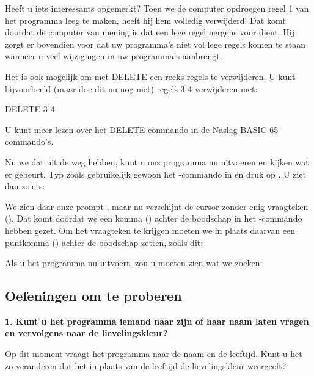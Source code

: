 
Heeft u iets interessants opgemerkt? Toen we de computer opdroegen regel 1 van het programma leeg te maken, heeft hij hem volledig verwijderd! Dat komt doordat de computer van mening is dat een lege regel nergens voor dient. Hij zorgt er bovendien voor dat uw programma's niet vol lege regels komen te staan wanneer u veel wijzigingen in uw programma's aanbrengt.

Het is ook mogelijk om met DELETE een reeks regels te verwijderen. U kunt bijvoorbeeld (maar doe dit nu nog niet) regels 3-4 verwijderen met:

\begin{screencode}
  DELETE 3-4
\end{screencode}

U kunt meer lezen over het DELETE-commando in de Naslag BASIC 65-commando's.

\needspace{4cm}
Nu we dat uit de weg hebben, kunt u ons programma nu uitvoeren en kijken wat er gebeurt. Typ zoals gebruikelijk gewoon het -commando in en druk op . U ziet dan zoiets:


\needspace{2.5cm}
We zien daar onze prompt , maar nu verschijnt de cursor zonder enig vraagteken (). Dat komt doordat we een komma (\stw{,}) achter de boodschap in het -commando hebben gezet. Om het vraagteken te krijgen moeten we in plaats daarvan een puntkomma (\stw{;}) achter de boodschap zetten, zoals dit:


\needspace{4cm}
Als u het programma nu uitvoert, zou u moeten zien wat we zoeken:


  \subsection{Oefeningen om te proberen}

{\bf 1. Kunt u het programma iemand naar zijn of haar naam laten vragen en vervolgens naar de lievelingskleur?}

Op dit moment vraagt het programma naar de naam en de leeftijd. Kunt u het zo veranderen dat het in plaats van de leeftijd de lievelingskleur weergeeft?

